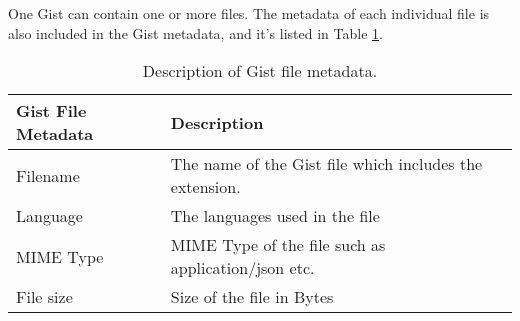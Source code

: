 One Gist can contain one or more files. The metadata of each individual file is also included in the Gist metadata, and it's listed in Table \ref{tb:filemetadata}.
\begin{table}[!htb]
 \begin{center}
 \begin{tabular}{@{}ll} 
    \textbf{Gist File Metadata}	&	\textbf{Description}\\ \hline
    Filename & The name of the Gist file which includes the extension.\\
    Language & The languages used in the file\\
	MIME Type & MIME Type of the file such as application/json etc.\\ 
	File size &	Size of the file in Bytes\\ \hline
 \end{tabular}
 \end{center}
 \caption{Description of Gist file metadata.}
 \label{tb:filemetadata}
\end{table}
